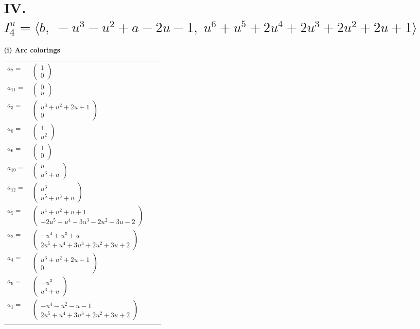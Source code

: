\documentclass[1p]{elsarticle_modified}
\theoremstyle{definition}
\begin{document}
\centering \section*{IV. $I^u_{4}= \langle b,\;- u^3- u^2+a-2 u-1,\;u^6+u^5+2 u^4+2 u^3+2 u^2+2 u+1 \rangle$}
\flushleft \textbf{(i) Arc colorings}\\
\begin{tabular}{m{7pt} m{180pt} m{7pt} m{180pt} }
\flushright $a_{7}=$&$\begin{pmatrix}1\\0\end{pmatrix}$ \\
\flushright $a_{11}=$&$\begin{pmatrix}0\\u\end{pmatrix}$ \\
\flushright $a_{3}=$&$\begin{pmatrix}u^3+u^2+2 u+1\\0\end{pmatrix}$ \\
\flushright $a_{8}=$&$\begin{pmatrix}1\\u^2\end{pmatrix}$ \\
\flushright $a_{6}=$&$\begin{pmatrix}1\\0\end{pmatrix}$ \\
\flushright $a_{10}=$&$\begin{pmatrix}u\\u^3+u\end{pmatrix}$ \\
\flushright $a_{12}=$&$\begin{pmatrix}u^3\\u^5+u^3+u\end{pmatrix}$ \\
\flushright $a_{5}=$&$\begin{pmatrix}u^4+u^2+u+1\\-2 u^5- u^4-3 u^3-2 u^2-3 u-2\end{pmatrix}$ \\
\flushright $a_{2}=$&$\begin{pmatrix}- u^4+u^3+u\\2 u^5+u^4+3 u^3+2 u^2+3 u+2\end{pmatrix}$ \\
\flushright $a_{4}=$&$\begin{pmatrix}u^3+u^2+2 u+1\\0\end{pmatrix}$ \\
\flushright $a_{9}=$&$\begin{pmatrix}- u^3\\u^3+u\end{pmatrix}$ \\
\flushright $a_{1}=$&$\begin{pmatrix}- u^4- u^2- u-1\\2 u^5+u^4+3 u^3+2 u^2+3 u+2\end{pmatrix}$\\&\end{tabular}
\end{document}
